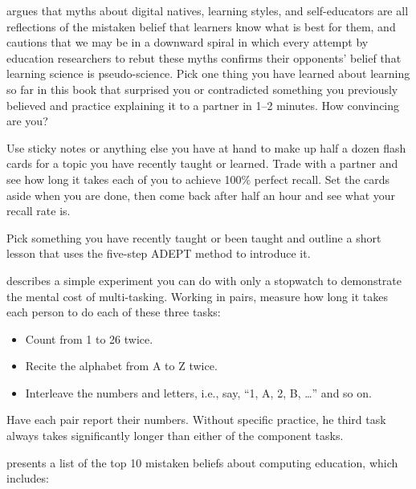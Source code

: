 
\cite{Kirs2013} argues that myths about digital natives,
learning styles,
and self-educators are all reflections of the mistaken belief that
learners know what is best for them,
and cautions that we may be in a downward spiral
in which every attempt by education researchers to rebut these myths
confirms their opponents' belief that learning science is pseudo-science.
Pick one thing you have learned about learning so far in this book
that surprised you or contradicted something you previously believed
and practice explaining it to a partner in 1--2 minutes.
How convincing are you?


Use sticky notes or anything else you have at hand
to make up half a dozen flash cards
for a topic you have recently taught or learned.
Trade with a partner and see how long it takes each of you
to achieve 100\% perfect recall.
Set the cards aside when you are done,
then come back after half an hour and see what your recall rate is.


Pick something you have recently taught or been taught
and outline a short lesson that uses the five-step ADEPT method to introduce it.


describes a simple experiment you can do with only a stopwatch
to demonstrate the mental cost of multi-tasking.
Working in pairs,
measure how long it takes each person to do each of these three tasks:

\begin{itemize}
\item
  Count from 1 to 26 twice.
\item
  Recite the alphabet from A to Z twice.
\item
  Interleave the numbers and letters,
  i.e., say, ``1, A, 2, B, {\ldots}''
  and so on.
\end{itemize}

Have each pair report their numbers.
Without specific practice,
he third task always takes significantly longer than either of the component tasks.


\cite{Guzd2015b} presents a list of the top 10 mistaken beliefs about computing education,
which includes:

